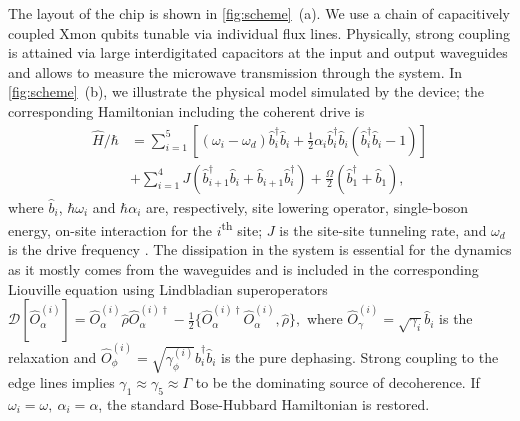 \documentclass[%
 aps, prl,
 amsmath,amssymb,
 reprint,%
superscriptaddress
]{revtex4-2}
\begin{document}
The layout of the chip is shown in \autoref{fig:scheme}~(a). We use a chain of capacitively coupled Xmon qubits tunable via individual flux lines. Physically, strong coupling is attained via large interdigitated capacitors at the input and output waveguides and allows to measure the microwave transmission through the system. In \autoref{fig:scheme}~(b), we illustrate the physical model simulated by the device; the corresponding Hamiltonian including the coherent drive is
\begin{equation}
\begin{aligned}
\hat H/\hbar &= \sum_{i=1}^5\left[ (\omega_i - \omega_d) \hat b^\dag_i \hat b_i + \frac{1}{2} \alpha_i \hat b_i^\dag \hat b_i (\hat b^\dag_i \hat b_i - 1)\right]\\
&+\sum_{i=1}^4 J (\hat b^\dag_{i+1} \hat b_i + \hat b_{i+1} \hat b_i^\dag)+\frac{\Omega}{2}(\hat b_1^\dag + \hat b_1),
\end{aligned}\label{eq:bose-hubbard}
\end{equation} 
where $\hat b_i$, $\hbar \omega_i$ and $\hbar\alpha_i$ are, respectively, site lowering operator, single-boson energy, on-site interaction for the $i$\textsuperscript{th} site; $J$ is the site-site tunneling rate, and $\omega_d$ is the drive frequency \cite{egorova2020analog, PhysRevA.102.013707, yanay2020two}. The dissipation in the system is essential for the dynamics as it mostly comes from the waveguides and is included in the corresponding Liouville equation using Lindbladian superoperators $\mathcal D[\hat{O}^{(i)}_\alpha] = \hat{O}^{(i)}_\alpha \hat \rho \hat{O}^{(i)\dag}_\alpha - \frac{1}{2}\{\hat{O}^{(i)\dag}_\alpha \hat{O}^{(i)}_\alpha, \hat \rho\},$ where $\hat{O}^{(i)}_\gamma = \sqrt{\gamma_i} \hat b_i$ is the relaxation and $\hat{O}^{(i)}_\phi = \sqrt{\gamma^{(i)}_\phi} \hat b_i^\dag \hat b_i$ is the pure dephasing. Strong coupling to the edge lines implies $\gamma_1 \approx \gamma_5 \approx \Gamma$ to be the dominating source of decoherence. If $\omega_i = \omega,\ \alpha_i = \alpha$, the standard Bose-Hubbard Hamiltonian is restored.
\end{document}
